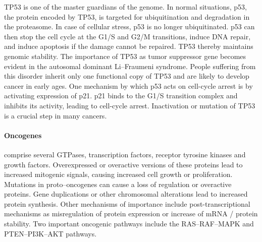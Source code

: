 {{{      TP53 is one of the master guardians of the genome. In normal situations,
      p53, the protein encoded by TP53, is targeted for ubiquitination and
      degradation in the proteasome. In case of cellular stress, p53 is no
      longer ubiquitinated. p53 can then stop the cell cycle at the G1/S and
      G2/M transitions, induce DNA repair, and induce apoptosis if the damage
      cannot be repaired. TP53 thereby maintains genomic stability. The
      importance of TP53 as tumor suppressor gene becomes evident in the
      autosomal dominant Li--Fraumeni syndrome. People suffering from this
      disorder inherit only one functional copy of TP53 and are likely to
      develop cancer in early ages. One mechanism by which p53 acts on
      cell-cycle arrest is by activating expression of p21. p21 binds to the
      G1/S transition complex and inhibits its activity, leading to cell-cycle
      arrest. Inactivation or mutation of TP53 is a crucial step in many
      cancers.

      \paragraph{Oncogenes} comprise several GTPases, transcription factors,
      receptor tyrosine kinases and growth factors. Overexpressed or overactive
      versions of these proteins lead to increased mitogenic signals,
      causing increased cell growth or proliferation. Mutations in
      proto--oncogenes can cause a loss of regulation or overactive proteins.
      Gene duplications or other chromosomal alterations lead to increased
      protein synthesis. Other mechanisms of importance include
      post-transcriptional mechanisms as misregulation of protein expression or
      increase of mRNA / protein stability. Two important oncogenic pathways
      include the RAS--RAF--MAPK and PTEN--PI3K--AKT pathways.

}}}
